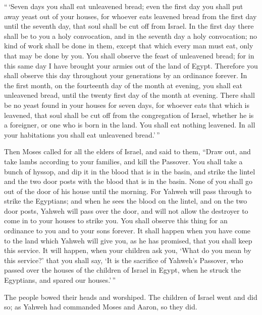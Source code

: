  ``\,`Seven days you shall eat unleavened bread; even the
first day you shall put away yeast out of your houses, for whoever eats
leavened bread from the first day until the seventh day, that soul shall
be cut off from Israel.  In the first day there shall be to
you a holy convocation, and in the seventh day a holy convocation; no
kind of work shall be done in them, except that which every man must
eat, only that may be done by you.  You shall observe the
feast of unleavened bread; for in this same day I have brought your
armies out of the land of Egypt. Therefore you shall observe this day
throughout your generations by an ordinance forever.  In
the first month, on the fourteenth day of the month at evening, you
shall eat unleavened bread, until the twenty first day of the month at
evening.  There shall be no yeast found in your houses for
seven days, for whoever eats that which is leavened, that soul shall be
cut off from the congregation of Israel, whether he is a foreigner, or
one who is born in the land.  You shall eat nothing
leavened. In all your habitations you shall eat unleavened bread.'\,''

 Then Moses called for all the elders of Israel, and said
to them, ``Draw out, and take lambs according to your families, and kill
the Passover.  You shall take a bunch of hyssop, and dip it
in the blood that is in the basin, and strike the lintel and the two
door posts with the blood that is in the basin. None of you shall go out
of the door of his house until the morning.  For Yahweh
will pass through to strike the Egyptians; and when he sees the blood on
the lintel, and on the two door posts, Yahweh will pass over the door,
and will not allow the destroyer to come in to your houses to strike
you.  You shall observe this thing for an ordinance to you
and to your sons forever.  It shall happen when you have
come to the land which Yahweh will give you, as he has promised, that
you shall keep this service.  It will happen, when your
children ask you, `What do you mean by this service?'  that
you shall say, `It is the sacrifice of Yahweh's Passover, who passed
over the houses of the children of Israel in Egypt, when he struck the
Egyptians, and spared our houses.'\,''

The people bowed their heads and worshiped.  The children
of Israel went and did so; as Yahweh had commanded Moses and Aaron, so
they did.

